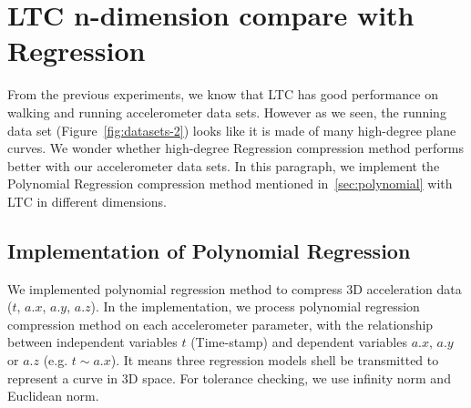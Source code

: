 \section{LTC n-dimension compare with Regression}

From the previous experiments, we know that LTC has good performance on  walking
and running accelerometer data sets. However as we seen, the running data set
(Figure~\ref{fig:datasets-2}) looks like it is made of many high-degree plane
curves. We wonder whether high-degree Regression compression method performs
better with our accelerometer data sets. In this paragraph, we implement the
Polynomial Regression compression method mentioned in~\ref{sec:polynomial} with
LTC in different dimensions.


\subsection{Implementation of Polynomial Regression}

We implemented polynomial regression method to compress 3D acceleration data
($t$, $a.x$, $a.y$, $a.z$). In the implementation, we process polynomial
regression compression method on each accelerometer parameter, with the
relationship between independent variables $t$ (Time-stamp) and dependent
variables $a.x$, $a.y$ or $a.z$ (e.g. $t \sim a.x$). It means  three regression
models shell be transmitted to represent a curve in 3D space. For tolerance
checking, we use infinity norm and Euclidean norm.

